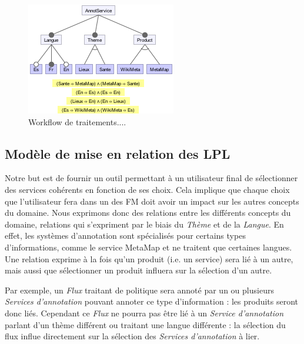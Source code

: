 \documentclass[]{easychair}
\newcommand{\comment}[4]{\par\noindent\hspace*{-0.5cm}{\parbox{\columnwidth}{\textbf{\color{#1}//#2[#3]:#4}}}\par}
\newcommand{\si}[1]{\comment{red}{}{#1}{SI}}
\begin{document}
\begin{figure}[htb!]
	\begin{centering}
	\includegraphics[scale=0.7]{FM.png}
	\caption{Workflow de traitements....}
	\label{fig:mmFM}
	\end{centering}
\end{figure}

\subsection{Modèle de mise en relation des LPL}
Notre but est de fournir un outil permettant à un utilisateur final de sélectionner des services cohérents en fonction de ses choix. Cela implique que chaque choix que l'utilisateur fera dans un des FM doit avoir un impact sur les autres concepts du domaine. 
Nous exprimons donc des relations entre les différents concepts du domaine, relations qui s'expriment par le biais du \textit{Thème} et de la \textit{Langue}. En effet, les systèmes d'annotation sont spécialisés pour certains types d'informations, comme le service MetaMap \cite{MetaMap} et ne traitent que certaines langues. Une relation exprime à la fois qu'un produit (i.e. un service) sera lié à un autre, mais aussi que sélectionner un produit influera sur la sélection d'un autre.

Par exemple, un \textit{Flux} traitant de politique sera annoté par un ou plusieurs \textit{Services d'annotation} pouvant annoter ce type d'information : les produits seront donc liés. Cependant ce \textit{Flux} ne pourra pas être lié à un \textit{Service d'annotation} parlant d'un thème différent ou traitant une langue différente : la sélection du flux influe directement sur la sélection des \textit{Services d'annotation} à lier.
\end{document}

